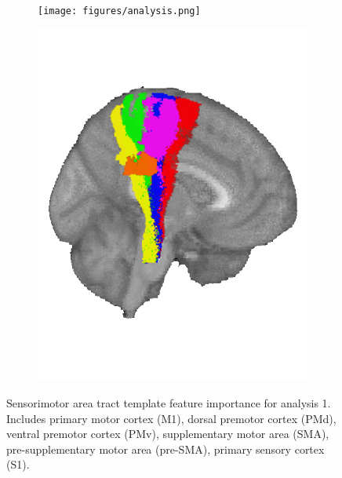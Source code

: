 \documentclass[10pt]{article}
\begin{document}
\begin{figure}
\begin{subfigure}{0.5\textwidth}
  \centering
  \texttt{[image: figures/analysis.png]}
  \caption{}
  \label{fig:sfig1}
\end{subfigure}
\begin{subfigure}{0.3\textwidth}
  \centering
  \includegraphics[width=1\linewidth]{figures/smatt_clear.png}
  \caption{}
  \label{fig:sfig1}
\end{subfigure}
\caption{Sensorimotor area tract template feature importance for analysis 1. Includes primary motor cortex (M1), dorsal premotor cortex (PMd), ventral premotor cortex (PMv), supplementary motor area (SMA), pre-supplementary motor area (pre-SMA), primary sensory cortex (S1).}
\label{fig:fig}
\end{figure}
\end{document}
